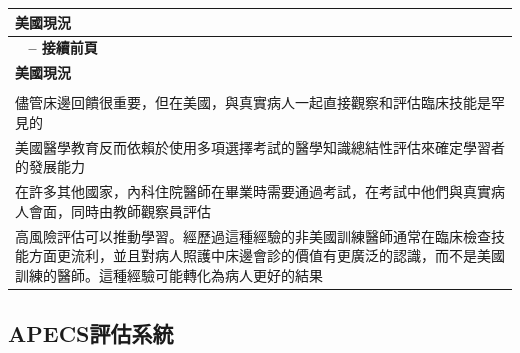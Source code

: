 \documentclass[12pt,a4paper]{article}
\begin{document}
\begin{longtable}{>{\raggedright\arraybackslash}p{15cm}}
\toprule
\textbf{\textcolor{emergency_blue}{美國現況}} \\
\midrule
\endfirsthead

\multicolumn{1}{c}%
{{\bfseries \tablename\ \thetable{} -- 接續前頁}} \\
\toprule
\textbf{\textcolor{emergency_blue}{美國現況}} \\
\midrule
\endhead

\midrule \multicolumn{1}{r}{{接續下頁}} \\ \midrule
\endfoot

\bottomrule
\endlastfoot

儘管床邊回饋很重要，但在美國，與真實病人一起直接觀察和評估臨床技能是罕見的 \\

美國醫學教育反而依賴於使用多項選擇考試的醫學知識總結性評估來確定學習者的發展能力 \\

在許多其他國家，內科住院醫師在畢業時需要通過考試，在考試中他們與真實病人會面，同時由教師觀察員評估 \\

高風險評估可以推動學習。經歷過這種經驗的非美國訓練醫師通常在臨床檢查技能方面更流利，並且對病人照護中床邊會診的價值有更廣泛的認識，而不是美國訓練的醫師。這種經驗可能轉化為病人更好的結果 \\
\end{longtable}

\subsection{APECS評估系統}
\end{document}
